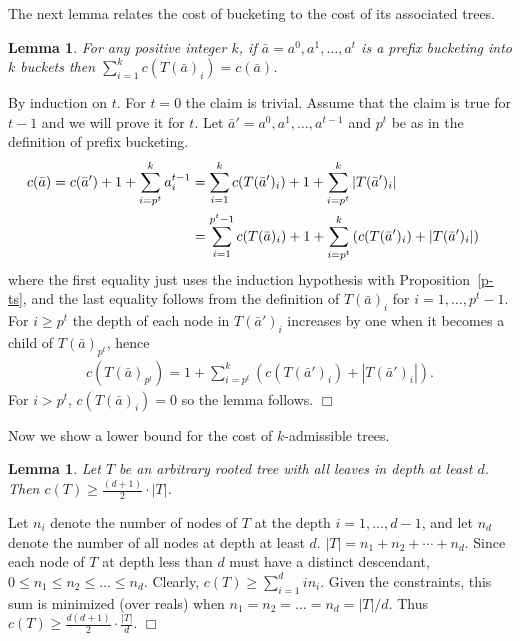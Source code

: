 \documentclass[11pt]{article}
\newtheorem{lemma}[theorem]{Lemma}
\newcommand{\qed}{$\Box$}
\newenvironment{proof}{\noindent {\bf Proof:}}{\hfill \qed \smallskip}
\begin{document}
The next lemma relates the cost of bucketing to the cost of its associated trees.
\begin{lemma}\label{l-tc}
For any positive integer $k$, if $\bar{a} = a^0,a^1,\dotsc,a^t$ is a prefix bucketing into $k$ buckets then
 $\sum_{i=1}^k c(T(\bar{a})_i) = c(\bar{a})$.
\end{lemma}

\begin{proof}
By induction on $t$. For $t=0$ the claim is trivial. Assume that the claim is true for $t-1$ and we will prove it for $t$.
Let $\bar{a}'=a^0,a^1,\dotsc,a^{t-1}$ and $p^t$ be as in the definition of prefix bucketing.
\begin{align*}
c(\bar{a}) = c(\bar{a}') + 1 + \sum_{i=p^t}^k a^{t-1}_i
&= \sum_{i=1}^k c(T(\bar{a}')_i) + 1 + \sum_{i=p^t}^k |T(\bar{a}')_i| \cr
&= \sum_{i=1}^{p^t-1} c(T(\bar{a})_i) + 1 + \sum_{i=p^t}^k \left(c(T(\bar{a}')_i) + |T(\bar{a}')_i|\right)
\end{align*}
where the first equality just uses the induction hypothesis with Proposition~\ref{p-ts},
and the last equality follows from the definition of $T(\bar{a})_i$ for $i=1,\dotsc,p^t-1$.
For $i\ge p^t$ the depth of each node in $T(\bar{a}')_i$ increases by one when it becomes a child of $T(\bar{a})_{p^t}$, hence
\begin{align*}
c(T(\bar{a})_{p^t}) =  1 + \sum_{i=p^t}^k \left(c(T(\bar{a}')_i) + |T(\bar{a}')_i|\right).
\end{align*}
For $i > p^t$, $c(T(\bar{a})_i) = 0$ so the lemma follows.
\end{proof}

Now we show a lower bound for the cost of $k$-admissible trees.

\begin{lemma}
\label{lm:k-d-cost}
Let $T$ be an arbitrary rooted tree with all leaves in depth at least $d$. Then $c(T) \geq \frac{(d + 1)}{2} \cdot |T|$.
\end{lemma}
\begin{proof} %
Let $n_i$ denote the number of nodes of $T$ at the depth $i = 1, \dotsc, d - 1$, and let $n_d$ denote the number of all nodes at depth at least $d$. $|T|=n_1+n_2 + \cdots + n_d$.
Since each node of $T$ at depth less than $d$ must have a distinct descendant, $0\leq n_1 \leq n_2 \leq \ldots \leq n_d$.
Clearly, $c(T) \geq \sum_{i=1}^d in_i$.
Given the constraints, this sum is minimized (over reals) when $n_1=n_2=\ldots =n_d = |T| / d $. Thus $c(T) \geq \frac{d(d + 1)}{2} \cdot \frac{|T|}{d}$.
\end{proof}
\end{document}
